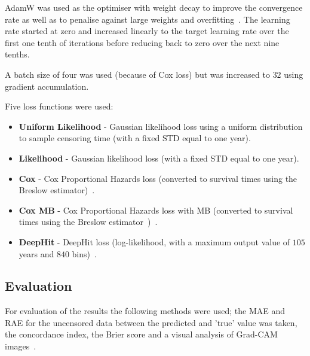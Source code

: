         AdamW was used as the optimiser with weight decay to improve the convergence rate as well as to penalise against large weights and overfitting~\cite{Loshchilov2019DecoupledRegularization}. The learning rate started at zero and increased linearly to the target learning rate over the first one tenth of iterations before reducing back to zero over the next nine tenths.

        A batch size of four was used (because of Cox loss) but was increased to $32$ using gradient accumulation.

        Five loss functions were used:

        \begin{itemize}
            \item \textbf{Uniform Likelihood} - Gaussian likelihood loss using a uniform distribution to sample censoring time (with a fixed \gls{STD} equal to one year).

            \item \textbf{Likelihood} - Gaussian likelihood loss (with a fixed \gls{STD} equal to one year).

            \item \textbf{Cox} - Cox Proportional Hazards loss (converted to survival times using the Breslow estimator)~\cite{Cox1972RegressionLife-Tables}.

            \item \textbf{Cox \gls{MB}} - Cox Proportional Hazards loss with \gls{MB} (converted to survival times using the Breslow estimator~\cite{Breslow1974CovarianceData})~\cite{Shahin2022SurvivalData}.

            \item \textbf{DeepHit} - DeepHit loss (log-likelihood, with a maximum output value of $105$ years and $840$ bins)~\cite{Lee2018DeepHit:Risks}.
        \end{itemize}

    \subsection{Evaluation} \label{sec:evaluation}
        For evaluation of the results the following methods were used; the \gls{MAE} and \gls{RAE} for the uncensored data between the predicted and 'true' value was taken, the concordance index, the Brier score and a visual analysis of Grad-CAM images~\cite{Raykar2008OnIndex, Gerds2006ConsistentTimes, Selvaraju2020Grad-CAM:Localization}.

